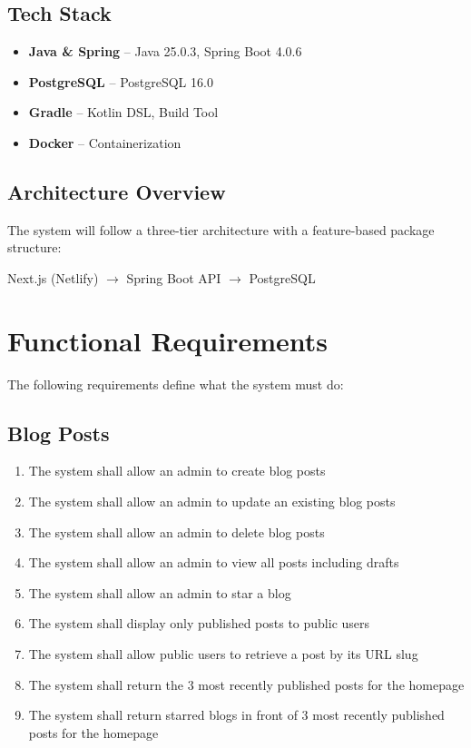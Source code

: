 \documentclass[11pt,a4paper]{article}
\newcommand{\architectureflow}[1]{
	\vspace{0.2em}                  
	\begin{center}
		{\ttfamily #1}      
	\end{center}
	\vspace{0.2em}                  
}
\newcommand{\entry}[2]{\item \textbf{#1} -- #2}
\begin{document}
	\subsection{Tech Stack}
	\begin{itemize}
		\entry{Java \& Spring}{Java 25.0.3, Spring Boot 4.0.6}
		\entry{PostgreSQL}{PostgreSQL 16.0}
		\entry{Gradle}{Kotlin DSL, Build Tool}
		\entry{Docker}{Containerization}
	\end{itemize}
	
	\subsection{Architecture Overview}
	The system will follow a three-tier architecture with a feature-based package structure:
	
	\architectureflow{Next.js (Netlify) $\rightarrow$ Spring Boot API $\rightarrow$ PostgreSQL}
	
	\section{Functional Requirements}
	The following requirements define what the system must do:
	\subsection{Blog Posts}
	
	\begin{enumerate}[label=\textbf{FR-\arabic*:}, leftmargin=2cm, itemsep=0.2em]
		\item The system shall allow an admin to create blog posts
		\item The system shall allow an admin to update an existing blog posts
		\item The system shall allow an admin to delete blog posts
		\item The system shall allow an admin to view all posts including drafts
		\item The system shall allow an admin to star a blog
		\item The system shall display only published posts to public users
		\item The system shall allow public users to retrieve a post by its URL slug
		\item The system shall return the 3 most recently published posts for the homepage
		\item The system shall return starred blogs in front of 3 most recently published posts for the homepage
	\end{enumerate}
	
\end{document}
